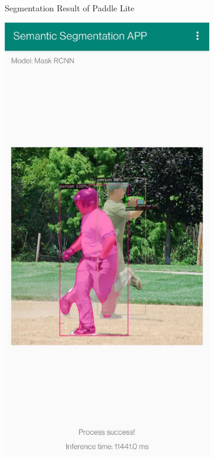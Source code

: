 \begin{figure}[htbp]
\begin{subfigure}[t]{0.3\linewidth}
        \caption{Segmentation Result of Paddle Lite}\label{resultpaddle}
    \end{subfigure}
    \begin{subfigure}[t]{0.3\linewidth}
        \includegraphics[width=1\textwidth]{figures/maskresult.jpg}

\end{subfigure}
\end{figure}
